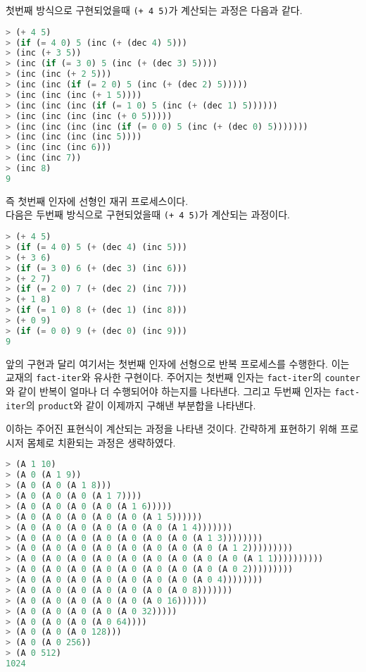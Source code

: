 
첫번째 방식으로 구현되었을때 \texttt{(+ 4 5)}가 계산되는 과정은 다음과 같다.

\begin{lstlisting}[language=Scheme]
> (+ 4 5)
> (if (= 4 0) 5 (inc (+ (dec 4) 5)))
> (inc (+ 3 5))
> (inc (if (= 3 0) 5 (inc (+ (dec 3) 5))))
> (inc (inc (+ 2 5)))
> (inc (inc (if (= 2 0) 5 (inc (+ (dec 2) 5)))))
> (inc (inc (inc (+ 1 5))))
> (inc (inc (inc (if (= 1 0) 5 (inc (+ (dec 1) 5))))))
> (inc (inc (inc (inc (+ 0 5)))))
> (inc (inc (inc (inc (if (= 0 0) 5 (inc (+ (dec 0) 5)))))))
> (inc (inc (inc (inc 5))))
> (inc (inc (inc 6)))
> (inc (inc 7))
> (inc 8)
9
\end{lstlisting}

즉 첫번째 인자에 선형인 재귀 프로세스이다.\\

다음은 두번째 방식으로 구현되었을때 \texttt{(+ 4 5)}가 계산되는 과정이다.

\begin{lstlisting}[language=Scheme]
> (+ 4 5)
> (if (= 4 0) 5 (+ (dec 4) (inc 5)))
> (+ 3 6)
> (if (= 3 0) 6 (+ (dec 3) (inc 6)))
> (+ 2 7)
> (if (= 2 0) 7 (+ (dec 2) (inc 7)))
> (+ 1 8)
> (if (= 1 0) 8 (+ (dec 1) (inc 8)))
> (+ 0 9)
> (if (= 0 0) 9 (+ (dec 0) (inc 9)))
9
\end{lstlisting}

앞의 구현과 달리 여기서는 첫번째 인자에 선형으로 반복 프로세스를
수행한다. 이는 교재의 \texttt{fact-iter}와 유사한 구현이다. 주어지는 첫번째
인자는 \texttt{fact-iter}의 \texttt{counter}와 같이 반복이 얼마나 더
수행되어야 하는지를 나타낸다. 그리고 두번째 인자는 \texttt{fact-iter}의
\texttt{product}와 같이 이제까지 구해낸 부분합을 나타낸다.


이하는 주어진 표현식이 계산되는 과정을 나타낸 것이다. 간략하게 표현하기 위해
프로시저 몸체로 치환되는 과정은 생략하였다.

\begin{lstlisting}[language=Scheme]
> (A 1 10)
> (A 0 (A 1 9))
> (A 0 (A 0 (A 1 8)))
> (A 0 (A 0 (A 0 (A 1 7))))
> (A 0 (A 0 (A 0 (A 0 (A 1 6)))))
> (A 0 (A 0 (A 0 (A 0 (A 0 (A 1 5))))))
> (A 0 (A 0 (A 0 (A 0 (A 0 (A 0 (A 1 4)))))))
> (A 0 (A 0 (A 0 (A 0 (A 0 (A 0 (A 0 (A 1 3))))))))
> (A 0 (A 0 (A 0 (A 0 (A 0 (A 0 (A 0 (A 0 (A 1 2)))))))))
> (A 0 (A 0 (A 0 (A 0 (A 0 (A 0 (A 0 (A 0 (A 0 (A 1 1))))))))))
> (A 0 (A 0 (A 0 (A 0 (A 0 (A 0 (A 0 (A 0 (A 0 2)))))))))
> (A 0 (A 0 (A 0 (A 0 (A 0 (A 0 (A 0 (A 0 4))))))))
> (A 0 (A 0 (A 0 (A 0 (A 0 (A 0 (A 0 8)))))))
> (A 0 (A 0 (A 0 (A 0 (A 0 (A 0 16))))))
> (A 0 (A 0 (A 0 (A 0 (A 0 32)))))
> (A 0 (A 0 (A 0 (A 0 64))))
> (A 0 (A 0 (A 0 128)))
> (A 0 (A 0 256))
> (A 0 512)
1024
\end{lstlisting}


